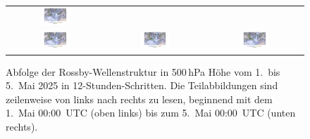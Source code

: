 \begin{figure}
\begin{tabular}{ccc}
		\includegraphics[width=0.32\textwidth, trim=3.1cm 3cm 3cm 0.8cm, clip]{papers/rossby/images/data_2025_5_3_12_00_500.jpg}   \\
		\includegraphics[width=0.32\textwidth, trim=3.1cm 3cm 3cm 0.8cm, clip]{papers/rossby/images/data_2025_5_4_00_00_500.jpg} &
		\includegraphics[width=0.32\textwidth, trim=3.1cm 3cm 3cm 0.8cm, clip]{papers/rossby/images/data_2025_5_4_12_00_500.jpg} &
		\includegraphics[width=0.32\textwidth, trim=3.1cm 3cm 3cm 0.8cm, clip]{papers/rossby/images/data_2025_5_5_00_00_500.jpg}   \\
	\end{tabular}
	\caption{Abfolge der Rossby-Wellenstruktur in 500\,hPa Höhe vom 1.\ bis 5.\ Mai 2025 in 12-Stunden-Schritten.
		Die Teilabbildungen sind zeilenweise von links nach rechts zu lesen, beginnend mit dem 1.\ Mai 00:00~UTC (oben links)
		bis zum 5.\ Mai 00:00~UTC (unten rechts).}
	\label{fig:rossby_grid}
\end{figure}

